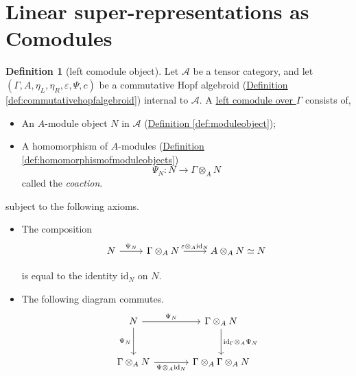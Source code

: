 \documentclass[a4paper,10pt]{scrreprt}
\newcommand{\defn}[1]{\ul{#1}}
\theoremstyle{definition}
\newtheorem{definition}{Definition}[section]
\theoremstyle{plain}
\theoremstyle{remark}
\begin{document}
\section{Linear super-representations as Comodules}
\begin{definition}[left comodule object]
  \label{def:leftcomoduleobject} 
  Let $\mathscr{A}$ be a tensor category, and let $(\Gamma, A, \eta_{L}, \eta_{R}, \varepsilon, \Psi, c)$ be a commutative Hopf algebroid (\hyperref[def:commutativehopfalgebroid]{Definition \ref*{def:commutativehopfalgebroid}}) internal to $\mathscr{A}$. A \defn{left comodule over $\Gamma$} consists of,
  \begin{itemize}
    \item An $A$-module object $N$ in $\mathscr{A}$ (\hyperref[def:moduleobject]{Definition \ref*{def:moduleobject}});

    \item A homomorphism of $A$-modules (\hyperref[def:homomorphismofmoduleobjects]{Definition \ref*{def:homomorphismofmoduleobjects}})
      \begin{equation*}
        \Psi_{N}\colon N \to \Gamma \otimes_{A} N
      \end{equation*}
      called the \emph{coaction}.
  \end{itemize}
  subject to the following axioms.
  \begin{itemize}
    \item The composition
      \begin{equation*}
        \begin{tikzcd}
          N
          \arrow[r, "\Psi_{N}"]
          & \Gamma \otimes_{A} N
          \arrow[r, "\varepsilon \otimes_{A} \mathrm{id}_{N}"]
          & A \otimes_{A} N \simeq N
        \end{tikzcd}
      \end{equation*}

      is equal to the identity $\mathrm{id}_{N}$ on $N$.

    \item The following diagram commutes.
      \begin{equation*}
        \begin{tikzcd}[row sep=large, column sep=large]
          N
          \arrow[r, "\Psi_{N}"]
          \arrow[d, swap, "\Psi_{N}"]
          & \Gamma \otimes_{A} N
          \arrow[d, "\mathrm{id}_{\Gamma} \otimes_{A} \Psi_{N}"]
          \\
          \Gamma \otimes_{A} N
          \arrow[r, swap, "\Psi \otimes_{A} \mathrm{id}_{N}"]
          & \Gamma \otimes_{A} \Gamma \otimes_{A} N
        \end{tikzcd}
      \end{equation*}
  \end{itemize}
\end{definition}
\end{document}
